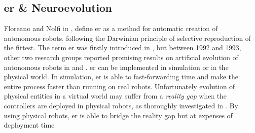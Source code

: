 \documentclass[conference]{IEEEtran}
\begin{document}
\subsection{\acrlong{er} \& Neuroevolution}
Floreano and Nolfi in \cite{nolfi2000evolutionary}, define \gls{er} as a method for automatic creation of autonomous robots, following the Darwinian principle of selective reproduction of the fittest.
The term \acrlong{er} was firstly introduced in \cite{cli1993evolving}, but between 1992 and 1993, other two research groups reported promising results on artificial evolution of autonomous robots in \cite{lewis1992genetic} and \cite{nolfi1994evolve}.
\gls{er} can be implemented in simulation or in the physical world.
In simulation, \gls{er} is able to fast-forwarding time and make the entire process faster than running on real robots.
Unfortunately evolution of physical entities in a virtual world may suffer from a \textit{reality gap} when the controllers are deployed in physical robots, as thoroughly investigated in \cite{jakobi1995noise}.
By using physical robots, \gls{er} is able to bridge the reality gap but at expenses of deployment time
\end{document}
